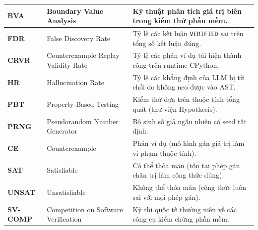 \begin{center}
\begin{longtable}{|p{}|p{}|p{}|}
\hline
\textbf{BVA} & Boundary Value Analysis & Kỹ thuật phân tích giá trị biên trong kiểm thử phần mềm. \\
\hline
\textbf{FDR} & False Discovery Rate & Tỷ lệ các kết luận \texttt{VERIFIED} sai trên tổng số kết luận đúng. \\
\hline
\textbf{CRVR} & Counterexample Replay Validity Rate & Tỷ lệ các phản ví dụ tái hiện thành công trên runtime CPython. \\
\hline
\textbf{HR} & Hallucination Rate & Tỷ lệ các khẳng định của LLM bị từ chối do không neo được vào AST. \\
\hline
\textbf{PBT} & Property-Based Testing & Kiểm thử dựa trên thuộc tính tổng quát (thư viện Hypothesis). \\
\hline
\textbf{PRNG} & Pseudorandom Number Generator & Bộ sinh số giả ngẫu nhiên có seed tất định. \\
\hline
\textbf{CE} & Counterexample & Phản ví dụ (mô hình gán giá trị làm vi phạm thuộc tính). \\
\hline
\textbf{SAT} & Satisfiable & Có thể thỏa mãn (tồn tại phép gán chân trị làm công thức đúng). \\
\hline
\textbf{UNSAT} & Unsatisfiable & Không thể thỏa mãn (công thức luôn sai với mọi phép gán). \\
\hline
\textbf{SV-COMP} & Competition on Software Verification & Kỳ thi quốc tế thường niên về các công cụ kiểm chứng phần mềm. \\
\hline
\end{longtable}
\end{center}
